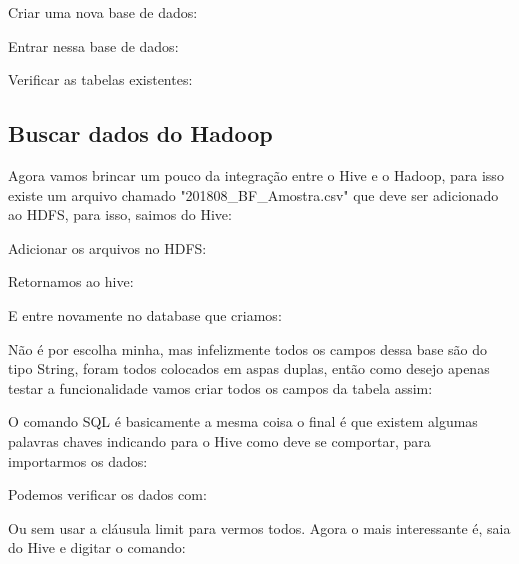 \documentclass[a4paper,11pt]{article}
\begin{document}
Criar uma nova base de dados: \\

Entrar nessa base de dados: \\

Verificar as tabelas existentes: \\

\subsection{Buscar dados do Hadoop}
Agora vamos brincar um pouco da integração entre o Hive e o Hadoop, para isso existe um arquivo chamado "201808\_BF\_Amostra.csv" que deve ser adicionado ao HDFS, para isso, saimos do Hive: \\

Adicionar os arquivos no HDFS: \\

Retornamos ao hive: \\

E entre novamente no database que criamos: \\

Não é por escolha minha, mas infelizmente todos os campos dessa base são do tipo String, foram todos colocados em aspas duplas, então como desejo apenas testar a funcionalidade vamos criar todos os campos da tabela assim: \\

O comando SQL é basicamente a mesma coisa o final é que existem algumas palavras chaves indicando para o Hive como deve se comportar, para importarmos os dados: \\

Podemos verificar os dados com: \\

Ou sem usar a cláusula limit para vermos todos. Agora o mais interessante é, saia do Hive e digitar o comando: \\
\end{document}
